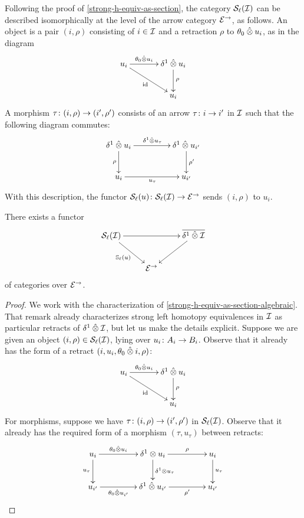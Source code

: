 \documentclass[reqno,10pt,a4paper,oneside]{amsart}
\begin{document}
\begin{remark}
\label{strong-h-equiv-as-section-algebraic}
Following the proof of \cref{strong-h-equiv-as-section}, the category $\cal{S}_\ell(\cal{I})$ can be described isomorphically at the level of the arrow category $\catE^{\to}$, as follows.  An object is a pair $(i, \rho)$ consisting of $i \in \cal{I}$ and a retraction $\rho$ to $\thetal \hatotimes u_i$, as in the diagram
\[
\xymatrix@C+1em{
u_i 
  \ar[r]^-{\thetal \hatotimes u_i }
  \ar[dr]_{\id}
&
  \rcyl \hatotimes u_i \ar[d]^{\rho}
\\&
  u_i
}
\]
A morphism $\tau \co (i, \rho) \to (i', \rho')$ consists of an arrow $\tau \co i \to i'$ in $\cal{I}$ such that the following
diagram commutes:
\[
\xymatrix@C+2em{
  \rcyl \hatotimes u_i 
  \ar[d]_-{\rho}
  \ar[r]^{\rcyl \hatotimes u_\tau }
&
 \rcyl \hatotimes u_{i'} 
  \ar[d]^-{\rho'}
\\
  u_i
  \ar[r]_{u_\tau}
&
  u_{i'}
}
\]
With this description, the functor $\cal{S}_\ell(u) \co \cal{S}_\ell(\cal{I}) \to \catE^{\to}$ sends $(i, \rho)$ to $u_i$.
\end{remark}



\begin{lemma}
\label{she-to-retract-closure}
There exists a functor 
\[
\xymatrix{
\cal{S}_\ell(\cal{I})  \ar[dr]_{\mathbb{S}_\ell(u)} \ar[rr] & & \overline{\rcyl \hatotimes \cal{I}} \ar[dl] \\
  & \catE^{\to} & }
\] 
of categories over $\catE^{\to}$.
\end{lemma}

\begin{proof}
We work with the characterization of \cref{strong-h-equiv-as-section-algebraic}.
That remark already characterizes strong left homotopy equivalences in $\cal{I}$ as particular retracts of $\rcyl \hatotimes \cal{I}$, but let us make
the details explicit. Suppose we are given an object $(i, \rho) \in \cal{S}_\ell(\cal{I})$, lying over $u_i \co A_i \to B_i$.
Observe that it already has the form of a retract $(i, u_i, \thetal \hatotimes i, \rho)$:
\[
\xymatrix@C+1em{
 u_i 
  \ar[r]^-{\thetal \hatotimes u_i}
  \ar[dr]_{\id}
&
  \rcyl \hatotimes u_i  \ar[d]^{\rho}
\\&
  u_i
}
\]
For morphisms, suppose we have $\tau \co (i, \rho) \to (i', \rho')$ in $\cal{S}_\ell(\cal{I})$.
Observe that it already has the required form of a morphism $(\tau, u_\tau)$ between retracts:
\[
\xymatrix@C+2em{
  u_i
  \ar[r]^-{\thetal \hatotimes u_i}
  \ar[d]_{u_\tau}
  &
  \rcyl \otimes u_i
  \ar[r]^-{\rho}
  \ar[d]^{\rcyl \otimes u_\tau}
&
  u_i
  \ar[d]^{u_\tau}
\\
 u_{i'} 
  \ar[r]_-{\thetal \hatotimes u_{i'}}
&
  \rcyl \hatotimes u_{i'}
  \ar[r]_-{\rho'}
&
  u_{i'} 
}
\]
\end{proof}
\end{document}

